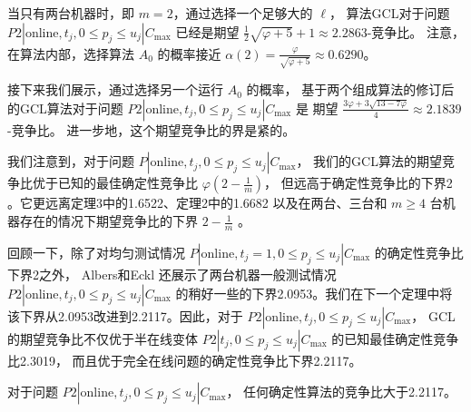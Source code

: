 当只有两台机器时，即 \( m = 2 \)，通过选择一个足够大的 \( \ell \)，
算法GCL对于问题 \( P2 | \text{online}, t_j, 0 \leq p_j \leq u_j | C_{\max} \) 
已经是期望 \( \frac{1}{2} \sqrt{\varphi + 5} + 1 \approx 2.2863 \)-竞争比。
注意，在算法内部，选择算法 \( A_0 \) 的概率接近 \( \alpha(2) = \frac{\varphi}{\sqrt{\varphi + 5}} \approx 0.6290 \)。

接下来我们展示，通过选择另一个运行 \( A_0 \) 的概率，
基于两个组成算法的修订后的GCL算法对于问题 \( P2 | \text{online}, t_j, 0 \leq p_j \leq u_j | C_{\max} \) 是
期望 \( \frac{3\varphi + 3\sqrt{13 - 7\varphi}}{4} \approx 2.1839 \)-竞争比。
进一步地，这个期望竞争比的界是紧的。

我们注意到，对于问题 \( P | \text{online}, t_j, 0 \leq p_j \leq u_j | C_{\max} \)，
我们的GCL算法的期望竞争比优于已知的最佳确定性竞争比 \( \varphi(2 - \frac{1}{m}) \)，
但远高于确定性竞争比的下界2 \cite{albers2021scheduling}。它更远离定理3中的1.6522、定理2中的1.6682
以及在两台、三台和 \( m \geq 4 \) 台机器存在的情况下期望竞争比的下界 \( 2 - \frac{1}{m} \) \cite{albers2021scheduling}。

回顾一下，除了对均匀测试情况 \( P | \text{online}, t_j = 1, 0 \leq p_j \leq u_j | C_{\max} \) 的确定性竞争比下界2之外，
Albers和Eckl \cite{albers2021scheduling} 还展示了两台机器一般测试情况 \( P2 | \text{online}, t_j, 0 \leq p_j \leq u_j | C_{\max} \) 的稍好一些的下界2.0953。我们在下一个定理中将该下界从2.0953改进到2.2117。因此，对于 \( P2 | \text{online}, t_j, 0 \leq p_j \leq u_j | C_{\max} \)，
GCL的期望竞争比不仅优于半在线变体 \( P2 | t_j, 0 \leq p_j \leq u_j | C_{\max} \) 的已知最佳确定性竞争比2.3019，
而且优于完全在线问题的确定性竞争比下界2.2117。

\begin{thm}
    对于问题 \( P2 | \text{online}, t_j, 0 \leq p_j \leq u_j | C_{\max} \)，
    任何确定性算法的竞争比大于2.2117。
\end{thm}

